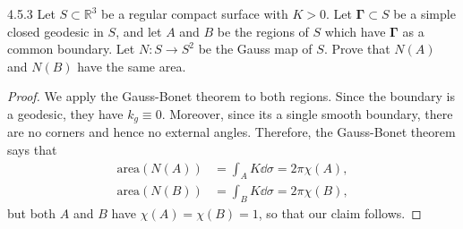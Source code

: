\documentclass[11pt]{article}
\begin{document}
\begin{problem}{4.5.3}
  Let \( S \subset \mathbb{R}^3 \) be a regular compact surface with \( K > 0 \). Let \( \mathbf{\Gamma} \subset S \) be a simple closed geodesic in \( S \), and let \( A \) and \( B \) be the regions of \( S \) which have \( \mathbf{\Gamma} \) as a common boundary.
  Let \( N: S \rightarrow S^2 \) be the Gauss map of \( S \).
  Prove that \( N(A) \) and \( N(B) \) have the same area.
\end{problem}
\begin{proof}
  We apply the Gauss-Bonet theorem to both regions.
  Since the boundary is a geodesic, they have \( k_g \equiv 0 \).
  Moreover, since its a single smooth boundary, there are no corners and hence no external angles.
  Therefore, the Gauss-Bonet theorem says that
  \begin{equation}
  \label{eq:35}
  \begin{aligned}
    \text{area}(N(A)) &= \int_{A} K\dd\sigma = 2\pi\chi(A), \\
    \text{area}(N(B)) &= \int_{B} K\dd\sigma = 2\pi\chi(B),
  \end{aligned}
\end{equation}
but both \( A \) and \( B \) have \( \chi(A) = \chi(B) = 1 \), so that our claim follows.
\end{proof}
\end{document}

